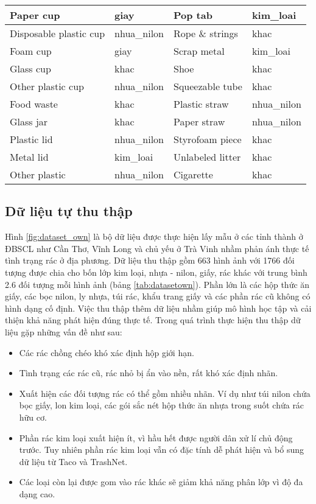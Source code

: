 \documentclass[../the.tex]{subfiles}
\begin{document}
\begin{table}[!ht]
\begin{tabular}{|l|l|l|l|}
        Paper cup & giay & Pop tab & kim\_loai \\ \hline
        Disposable plastic cup & nhua\_nilon & Rope \& strings & khac \\ \hline
        Foam cup & giay & Scrap metal & kim\_loai \\ \hline
        Glass cup & khac & Shoe & khac \\ \hline
        Other plastic cup & nhua\_nilon & Squeezable tube & khac \\ \hline
        Food waste & khac & Plastic straw & nhua\_nilon \\ \hline
        Glass jar & khac & Paper straw & nhua\_nilon \\ \hline
        Plastic lid & nhua\_nilon & Styrofoam piece & khac \\ \hline
        Metal lid & kim\_loai & Unlabeled litter & khac \\ \hline
        Other plastic & nhua\_nilon & Cigarette & khac \\ \hline
    \end{tabular}
	\label{tab:taco_map}
\end{table}

\subsection{Dữ liệu tự thu thập}
\label{sec:own}
{\fontsize{13}{12} \selectfont
Hình \ref{fig:dataset_own} là bộ dữ liệu được thực hiện lấy mẫu ở các tỉnh thành ở ĐBSCL như Cần Thơ, Vĩnh Long và chủ yếu ở Trà Vinh nhầm phản ánh thực tế tình trạng rác ở địa phương. 
Dữ liệu thu thập gồm 663 hình ảnh với 1766 đối tượng được chia cho bốn lớp kim loại, nhựa - nilon, giấy, rác khác với trung bình 2.6 đối tượng mỗi hình ảnh (bảng \ref{tab:datasetown}).
Phần lớn là các hộp thức ăn giấy, các bọc nilon, ly nhựa, túi rác, khẩu trang giấy và các phần rác cũ không có hình dạng cố định. 
Việc thu thập thêm dữ liệu nhầm giúp mô hình học tập và cải thiện khả năng phát hiện đúng thực tế. Trong quá trình thực hiện thu thập dữ liệu gặp những vấn đề như sau:

\begin{itemize}
	\item Các rác chồng chéo khó xác định hộp giới hạn.
	\item Tình trạng các rác cũ, rác nhỏ bị ẩn vào nền, rất khó xác định nhãn.
	\item Xuất hiện các đối tượng rác có thể gồm nhiều nhãn. Ví dụ như túi nilon chứa bọc giấy, lon kim loại, các gói sắc nét hộp thức ăn nhựa trong suốt chứa rác hữu cơ.
	\item Phần rác kim loại xuất hiện ít, vì hầu hết được người dân xử lí chủ động trước. Tuy nhiên phần rác kim loại vẫn có đặc tính dễ phát hiện và bổ sung dữ liệu từ Taco \cite{proença2020taco} và TrashNet.
	\item Các loại còn lại được gom vào rác khác sẽ giảm khả năng phân lớp vì độ đa dạng cao.
\end{itemize}
}
\end{document}
